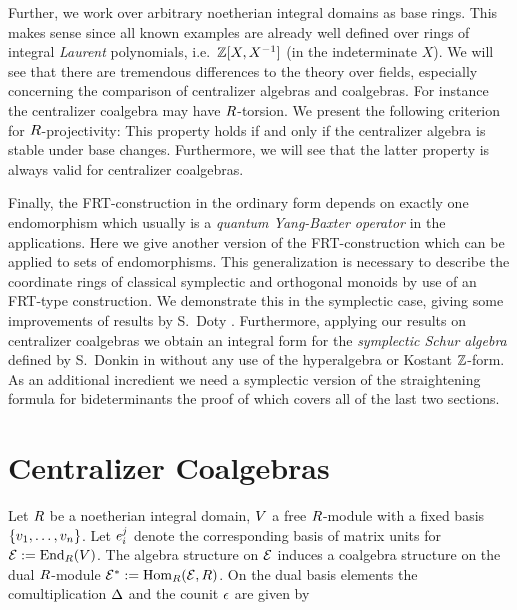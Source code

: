 \documentclass[twoside,12pt]{article}
\begin{document}
Further, we work over arbitrary noetherian integral domains as base rings. This makes
sense since all known examples are already well defined
over rings of integral {\em Laurent} polynomials, i.e.\
${\mathbb Z}[X, X^{-1}]$ (in the  indeterminate $X$). We will see that there are
tremendous differences to the theory over fields, especially
concerning the comparison of centralizer algebras and coalgebras.
For instance the centralizer coalgebra may have $R$-torsion. We present the
following criterion for $R$-projectivity: This property holds if and only if
the centralizer algebra is stable under base changes. Furthermore, we will see
that the latter property is always valid for centralizer coalgebras.
\Ab

Finally, the FRT-construction in the ordinary form depends on exactly
one endomorphism 
which usually is a {\em quantum Yang-Baxter operator} in the applications.
Here we give another version of the FRT-construction which can be applied to
sets of endomorphisms. This generalization is necessary to describe
the coordinate rings of 
classical symplectic and orthogonal monoids by use of an
FRT-type construction. We demonstrate this in the symplectic case, giving
some improvements of
results by S.\ Doty \cite{doty}. 
Furthermore, applying our results on centralizer coalgebras
we obtain an integral form for the {\em symplectic Schur algebra} 
defined by S.\ Donkin in \cite{donk3}
without any use of the hyperalgebra or Kostant ${\mathbb Z}$-form. As an additional incredient
we need a symplectic version of the straightening formula for bideterminants
the proof of which covers all of the last two sections.














\section{Centralizer Coalgebras}


Let $R$ be a noetherian integral domain, $V$ a free
$R$-module with a fixed basis $\{v_{1}, \ldots , v_{n}\}$. Let
$e_{i}^{ j}$ denote the corresponding basis of matrix units for
${\cal E}:={\rm End}_{R}{(V)}$. The algebra structure on ${\cal E}$ induces a
coalgebra structure on the dual $R$-module
${{\cal E}}^*:={\rm Hom}_{R}{({\cal E},R)}$. On the dual basis elements the comultiplication
$\Delta$ and the counit $\epsilon$ are given by
\end{document}
